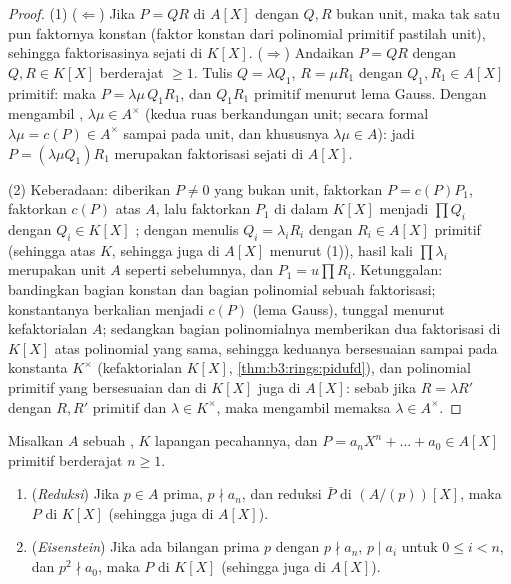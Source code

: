 \begin{proof}
(1) ($\Leftarrow$) Jika $P = QR$ di $A[X]$ dengan $Q, R$ bukan unit,
maka tak satu pun faktornya konstan (faktor konstan dari polinomial
primitif pastilah unit), sehingga faktorisasinya sejati di $K[X]$.
($\Rightarrow$) Andaikan $P = QR$ dengan $Q, R \in K[X]$ berderajat
$\geq 1$. Tulis $Q = \lambda Q_1$, $R = \mu R_1$ dengan $Q_1, R_1
\in A[X]$ primitif: maka $P = \lambda\mu\, Q_1R_1$, dan $Q_1R_1$
primitif menurut lema Gauss. Dengan mengambil , $\lambda\mu \in A^\times$
(kedua ruas berkandungan unit; secara formal $\lambda\mu = c(P) \in
A^\times$ sampai pada unit, dan khususnya $\lambda \mu \in A$): jadi $P
= (\lambda\mu Q_1) R_1$ merupakan faktorisasi sejati di $A[X]$.

(2) Keberadaan: diberikan $P \neq 0$ yang bukan unit, faktorkan $P = c(P)P_1$,
faktorkan $c(P)$ atas  $A$, lalu faktorkan $P_1$ di dalam
 $K[X]$ menjadi $\prod Q_i$ dengan $Q_i \in K[X]$ ; dengan menulis
$Q_i = \lambda_i R_i$ dengan $R_i \in A[X]$ primitif (sehingga
 atas $K$, sehingga juga di $A[X]$ menurut (1)), hasil kali
$\prod \lambda_i$ merupakan unit $A$ seperti sebelumnya, dan $P_1 = u\prod
R_i$. Ketunggalan: bandingkan bagian konstan dan bagian polinomial sebuah
faktorisasi; konstantanya berkalian menjadi $c(P)$ (lema Gauss), tunggal
menurut kefaktorialan $A$; sedangkan bagian polinomialnya memberikan dua
faktorisasi di $K[X]$ atas polinomial yang sama, sehingga keduanya bersesuaian sampai pada
konstanta $K^\times$ (kefaktorialan $K[X]$,
\cref{thm:b3:rings:pidufd}), dan polinomial primitif yang bersesuaian dan
 di $K[X]$ juga  di $A[X]$: sebab jika $R = \lambda R'$
dengan $R, R'$ primitif dan $\lambda \in K^\times$, maka mengambil
 memaksa $\lambda \in A^\times$.
\end{proof}

\begin{theorem}\label{thm:b3:rings:criteria}
Misalkan $A$ sebuah , $K$ lapangan pecahannya, dan $P = a_nX^n + \dots
+ a_0 \in A[X]$ primitif berderajat $n \geq 1$.
\begin{enumerate}
  \item (\emph{Reduksi}) Jika $p \in A$ prima, $p \nmid a_n$,
        dan reduksi $\bar P$  di
        $(A/(p))[X]$, maka $P$  di $K[X]$ (sehingga juga di
        $A[X]$).
  \item (\emph{Eisenstein}) Jika ada
        bilangan prima $p$ dengan $p \nmid a_n$, $p \mid a_i$ untuk $0
        \leq i < n$, dan $p^2 \nmid a_0$, maka $P$ 
        di $K[X]$ (sehingga juga di $A[X]$).
\end{enumerate}
\end{theorem}

